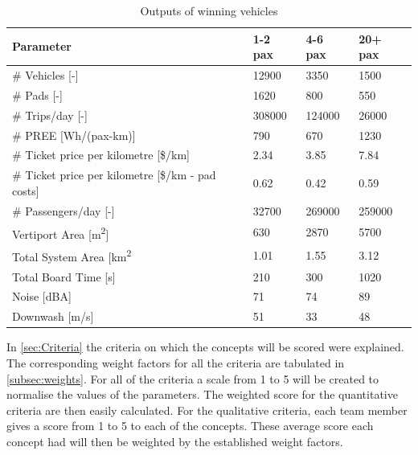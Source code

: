 \begin{table}[H]
\captionsetup{justification=centering}
\caption{Outputs of winning vehicles}
\label{outputswin}
\begin{tabular}{llll}
\hline
\textbf{Parameter}                          & \textbf{1-2 pax} & \textbf{4-6 pax} & \textbf{20+ pax} \\ \hline
\# Vehicles {[}-{]}                         & 12900             &     3350             & 1500             \\
\# Pads {[}-{]}                             & 1620             &        800          & 550              \\
\# Trips/day {[}-{]}                        & 308000           &       124000           & 26000            \\
\# PREE {[}Wh/(pax-km){]}                   & 790           &        670          & 1230           \\
\# Ticket price per kilometre {[}\$/km{]} & 2.34             &    3.85              & 7.84             \\
\# Ticket price per kilometre {[}\$/km - pad costs{]} & 0.62             &    0.42              & 0.59             \\
\# Passengers/day {[}-{]}                   & 32700           &     269000             & 259000           \\
Vertiport Area {[}m\textsuperscript{2}{]}   & 630            &     2870             & 5700             \\
Total System Area {[}km\textsuperscript{2}  & 1.01          &       1.55           & 3.12          \\
Total Board Time {[}s{]}                    & 210              &        300          & 1020             \\
Noise {[}dBA{]}                             & 71             &       74           & 89             \\ 
Downwash [m/s]                              & 51            &       33              &   48      \\ \hline
\end{tabular}
\end{table}

In \autoref{sec:Criteria} the criteria on which the concepts will be scored were explained. The corresponding weight factors for all the criteria are tabulated in \autoref{subsec:weights}. For all of the criteria a scale from 1 to 5 will be created to normalise the values of the parameters. The weighted score for the quantitative criteria are then easily calculated. For the qualitative criteria, each team member gives a score from 1 to 5 to each of the concepts. These average score each concept had will then be weighted by the established weight factors. 

